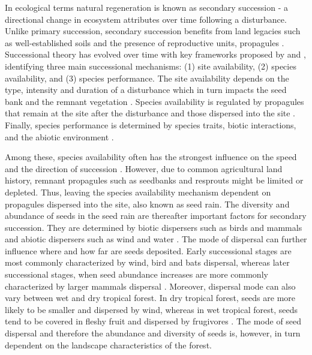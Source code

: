 
In ecological terms natural regeneration is known as secondary succession - a directional change in ecosystem attributes over time following a disturbance. Unlike primary succession, secondary succession benefits from land legacies such as well-established soils and the presence of reproductive units, propagules \citep{poorterSuccessionalTheories2023}. %
Successional theory has evolved over time with 
key frameworks proposed by \citet{pickettHierarchicalConsiderationCauses1987} and \citet{poorterComprehensiveFrameworkVegetation2024}, identifying three main successional mechanisms: (1) site availability, (2) species availability, and (3) species performance. The site availability depends on the type, intensity and duration of a disturbance which in turn impacts the seed bank and the remnant vegetation \citep{poorterComprehensiveFrameworkVegetation2024}. Species availability is regulated by propagules that remain at the site after the disturbance and those dispersed into the site \citep{gleasonIndividualisticConceptPlant1926, dentUnitingNicheDifferentiation2021}. Finally, species performance is determined by species traits, biotic interactions, and the abiotic environment \citep{poorterComprehensiveFrameworkVegetation2024}. 

Among these, species availability often has the strongest influence on the speed and the direction of succession \citep{poorterSuccessionalTheories2023, dentUnitingNicheDifferentiation2021}. However, due to common agricultural land history, remnant propagules such as seedbanks and resprouts might be limited or depleted. Thus, leaving the species availability mechanism dependent on propagules dispersed into the site, also known as seed rain. The diversity and abundance of seeds in the seed rain are thereafter important factors for secondary succession. They are determined by biotic dispersers such as birds and mammals and abiotic dispersers such as wind and water \citep{poorterComprehensiveFrameworkVegetation2024}. The mode of dispersal can further influence where and how far are seeds deposited. Early successional stages are most commonly characterized by wind, bird and bats dispersal, whereas later successional stages, when seed abundance increases are more commonly characterized by larger mammals dispersal \citep{dentUnitingNicheDifferentiation2021}. Moreover, dispersal mode can also vary between wet and dry tropical forest. In dry tropical forest, seeds are more likely to be smaller and dispersed by wind, whereas in wet tropical forest, seeds tend to be covered in fleshy fruit and dispersed by frugivores . The mode of seed dispersal and therefore the abundance and diversity of seeds is, however, in turn dependent on the landscape characteristics of the forest. 

